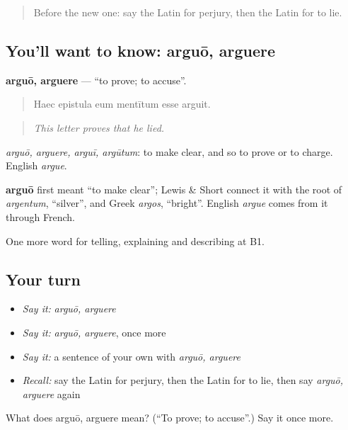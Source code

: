 \begin{quote}
Before the new one: say the Latin for perjury, then the Latin for to lie.
\end{quote}

\subsection*{You'll want to know: arguō, arguere}
\textbf{arguō, arguere} — \textquotedblleft{}to prove; to accuse\textquotedblright{}.

\begin{quote}
Haec epistula eum mentītum esse arguit.
\end{quote}

\begin{quote}
\emph{This letter proves that he lied.}
\end{quote}

\emph{arguō, arguere, arguī, argūtum}: to make clear, and so to prove or to charge. English \emph{argue}.

\begin{cousinweb}
\textbf{arguō} first meant \textquotedblleft{}to make clear\textquotedblright{}; Lewis \& Short connect it with the root of \emph{argentum}, \textquotedblleft{}silver\textquotedblright{}, and Greek \emph{argos}, \textquotedblleft{}bright\textquotedblright{}. English \emph{argue} comes from it through French.
\end{cousinweb}

\begin{grammarlens}[title={What you've built}]
One more word for telling, explaining and describing at B1.
\end{grammarlens}

\subsection*{Your turn}
\begin{itemize}
\raggedright
  \item \emph{Say it:} \emph{arguō, arguere}
  \item \emph{Say it:} \emph{arguō, arguere}, once more
  \item \emph{Say it:} a sentence of your own with \emph{arguō, arguere}
  \item \emph{Recall:} say the Latin for perjury, then the Latin for to lie, then say \emph{arguō, arguere} again
\end{itemize}

\begin{tcolorbox}[breakable,colback=teal!4,colframe=teal!35!black,title={Before you move on}]
What does arguō, arguere mean? (\textquotedblleft{}To prove; to accuse\textquotedblright{}.) Say it once more.
\end{tcolorbox}
